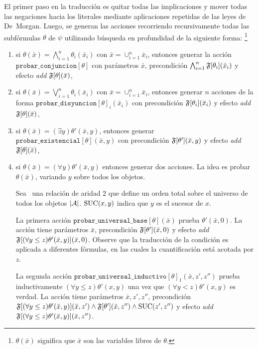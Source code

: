 El primer paso en la traducción es quitar todas las implicaciones
y mover todas las negaciones hacia los literales mediante aplicaciones
repetidas de las leyes de De~Morgan. Luego, se generan las acciones recorriendo
recursivamente todas las subfórmulas $\theta$ de $\psi$ utilizando
búsqueda en profundidad de la siguiente forma:
\footnote{$\theta(\bar x)$ significa que
$\bar x$ son las variables libres de $\theta$.}

\begin{enumerate}[--]
\item si $\theta(\bar x)=\bigwedge_{i=1}^n \theta_i(\bar x_i)$
  con $\bar x=\cup_{i=1}^n \bar x_i$, entonces generar la acción
  $\texttt{probar\_conjuncion}[\theta]$ con parámetros $\bar x$, precondición
  $\bigwedge_{i=1}^n \mathfrak{F}[\theta_i](\bar x_i)$ y efecto \textit{add}
  $\mathfrak{F}[\theta](\bar x)$,
%
\item si $\theta(\bar x)=\bigvee_{i=1}^n \theta_i(\bar x_i)$ con
  $\bar x=\cup_{i=1}^n \bar x_i$, entonces generar $n$ acciones de la forma
  $\texttt{probar\_disyuncion}[\theta]_i(\bar x_i)$ con precondición
  $\mathfrak{F}[\theta_i](\bar x_i)$ y efecto \textit{add} $\mathfrak{F}[\theta](\bar x)$,
%
\item si $\theta(\bar x)=(\exists y)\theta'(\bar x,y)$, entonces generar
  $\texttt{probar\_existencial}[\theta](\bar x,y)$ con precondición $\mathfrak{F}[\theta'](\bar x,y)$
  y efecto \textit{add} $\mathfrak{F}[\theta](\bar x)$,
%
\item si $\theta(\bar x)=(\forall y)\theta'(\bar x,y)$ entonces generar
  dos acciones. La idea es probar $\theta(\bar x)$, variando $y$
  sobre todos los objetos.

  Sea \SUC\ una relación de aridad 2 que define un orden total sobre el universo
  de todos los objetos $|\mathcal{A}|$. $\text{SUC}(x, y)$ indica que $y$ es el sucesor de $x$.

  La primera acción $\texttt{probar\_universal\_base}[\theta](\bar x)$ prueba $\theta'(\bar x,0)$.
  La acción tiene parámetros $\bar x$, precondición $\mathfrak{F}[\theta'](\bar x,0)$
  y efecto \textit{add} $\mathfrak{F}[(\forall y\leq z)\theta'(\bar x,y)](\bar x,0)$.
  Observe que la traducción de la condición es aplicada a diferentes
fórmulas,
  en las cuales la cuantificación está acotada por $z$.

  La segunda acción $\texttt{probar\_universal\_inductivo}[\theta]_1(\bar x,z',z'')$ prueba inductivamente
  $(\forall y\leq z)\theta'(x,y)$ una vez que $(\forall y<z)\theta'(x,y)$ es
verdad.
  La acción tiene parámetros $\bar x,z',z''$, precondición
  $\mathfrak{F}[(\forall y\leq z)\theta'(\bar x, y)](\bar x,z')\land\mathfrak{F}[\theta'](\bar x,z'')\land \text{SUC}(z',z'')$
  y efecto \textit{add} $\mathfrak{F}[(\forall y\leq z)\theta'(\bar x,y)](\bar x,z'')$.
\end{enumerate}
